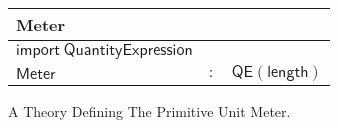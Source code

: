 \begin{figure}[h]
  \begin{center}
    \begin{tabular}{|l c l|}
      \hline
      \textsf{Meter} & &\\\hline
      $ \mathsf{import \ Quantity Expression}$ &&\\
      \hline
      $\mathsf{Meter}$ & $:$ & $ \mathsf{QE} \left( \mathsf{length} \right)$\\\hline
    \end{tabular}
  \end{center}

  \caption{A Theory Defining The Primitive Unit Meter. }
  \label{fig:meter}
\end{figure}
